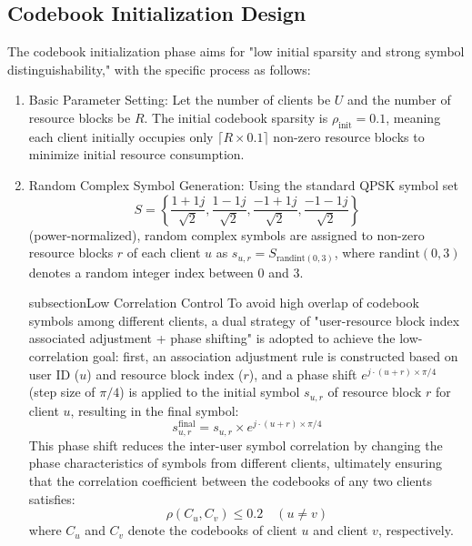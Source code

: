 \documentclass[runningheads]{llncs}
\begin{document}
\subsection{Codebook Initialization Design}
The codebook initialization phase aims for "low initial sparsity and strong symbol distinguishability," with the specific process as follows:
\begin{enumerate}
\item Basic Parameter Setting: Let the number of clients be $U$ and the number of resource blocks be $R$. The initial codebook sparsity is $\rho_{\text{init}} = 0.1$, meaning each client initially occupies only $\lceil R \times 0.1 \rceil$ non-zero resource blocks to minimize initial resource consumption.

\item Random Complex Symbol Generation: Using the standard QPSK symbol set 
\begin{equation*}
    S = \left\{ \frac{1+1j}{\sqrt{2}}, \frac{1-1j}{\sqrt{2}}, \frac{-1+1j}{\sqrt{2}}, \frac{-1-1j}{\sqrt{2}} \right\}
\end{equation*}
(power-normalized), random complex symbols are assigned to non-zero resource blocks $r$ of each client $u$ as $s_{u,r} = S_{\text{randint}(0,3)}$, where $\text{randint}(0,3)$ denotes a random integer index between 0 and 3.

subsection{Low Correlation Control}
To avoid high overlap of codebook symbols among different clients, a dual strategy of "user-resource block index associated adjustment + phase shifting" is adopted to achieve the low-correlation goal: 
first, an association adjustment rule is constructed based on user ID ($u$) and resource block index ($r$), 
and a phase shift $e^{j \cdot (u+r) \times \pi/4}$ (step size of $\pi/4$) is applied to the initial symbol $s_{u,r}$ 
of resource block $r$ for client $u$, resulting in the final symbol:
\begin{equation}
s_{u,r}^{\text{final}} = s_{u,r} \times e^{j \cdot (u+r) \times \pi/4} \tag{5}
\end{equation}
This phase shift reduces the inter-user symbol correlation by changing the phase characteristics of symbols from different clients, 
ultimately ensuring that the correlation coefficient between the codebooks of any two clients satisfies:
\begin{equation}
\rho(C_u, C_v) \leq 0.2 \quad (u \neq v)\tag{6}
\end{equation}
where $C_u$ and $C_v$ denote the codebooks of client $u$ and client $v$, respectively.




\end{enumerate}
\end{document}

